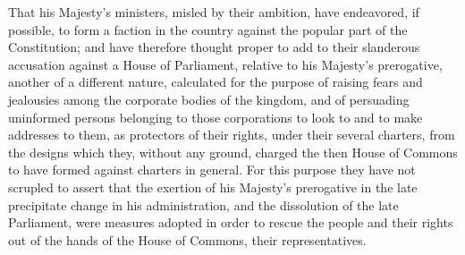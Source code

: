 That his Majesty's ministers, misled by their ambition, have endeavored, if possible, to form a faction in the country against the popular part of the Constitution; and have therefore thought proper to add to their slanderous accusation against a House of Parliament, relative to his Majesty's prerogative, another of a different nature, calculated for the purpose of raising fears and jealousies among the corporate bodies of the kingdom, and of persuading uninformed persons belonging to those corporations to look to and to make addresses to them, as protectors of their rights, under their several charters, from the designs which they, without any ground, charged the then House of Commons to have formed against charters in general. For this purpose they have not scrupled to assert that the exertion of his Majesty's prerogative in the late precipitate change in his administration, and the dissolution of the late Parliament, were measures adopted in order to rescue the people and their rights out of the hands of the House of Commons, their representatives.

